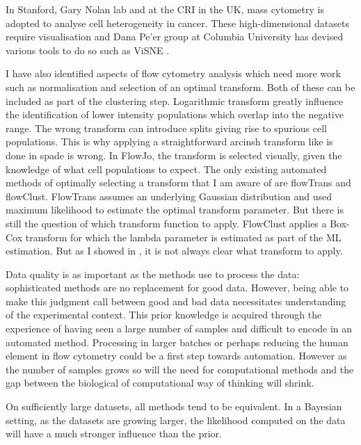 In Stanford, Gary Nolan lab and at the CRI in the UK, mass cytometry is adopted to analyse cell heterogeneity in cancer.
These high-dimensional datasets require visualisation and Dana Pe'er group at Columbia University has devised various tools to do so such as ViSNE \citep{Amir:2013jp}.

I have also identified aspects of flow cytometry analysis which need more work such as normalisation and selection of an optimal transform.
Both of these can be included as part of the clustering step.
Logarithmic transform greatly influence the identification of lower intensity populations which overlap into the negative range.
The wrong transform can introduce splits giving rise to spurious cell populations.
This is why applying a straightforward arcinsh transform like is done in spade is wrong.
In FlowJo, the transform is selected visually, given the knowledge of what cell populations to expect.
The only existing automated  methods of optimally selecting a transform that I am aware of are flowTrans and flowClust.
FlowTrans assumes an underlying Gaussian distribution and used maximum likelihood to estimate the optimal transform parameter.
But there is still the question of which transform function to apply.
FlowClust applies a Box-Cox transform for which the lambda parameter is estimated as part of the ML estimation.
But as I showed in , it is not always clear what transform to apply.


Data quality is as important as the methods use to process the data: sophisticated methods are no replacement for good data.
However, being able to make this judgment call between good and bad data necessitates understanding of the experimental context.
This prior knowledge is acquired through the experience of having seen a large number of samples and difficult to encode in an automated method.
Processing in larger batches or perhaps reducing the human element in flow cytometry could be a first step towards automation.
However as the number of samples grows so will the need for computational methods and the gap between the biological of computational way of thinking will shrink.

On sufficiently large datasets, all methods tend to be equivalent.
In a Bayesian setting, as the datasets are growing larger, the likelihood computed on the data will have a much stronger influence than the prior.

